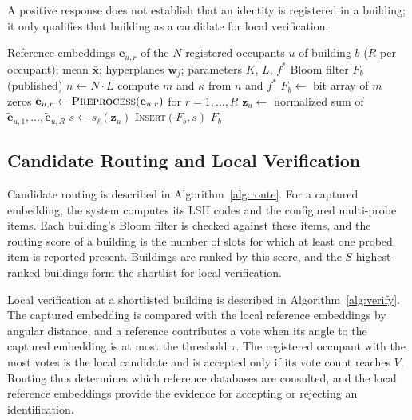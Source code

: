 \documentclass[pdflatex,sn-mathphys-num]{sn-jnl}%
\theoremstyle{thmstyleone}%
\theoremstyle{thmstyletwo}%
\theoremstyle{thmstylethree}%
\begin{document}
A positive response does not establish that an identity is registered in a building; it only qualifies that building as a candidate for local verification.

\begin{algorithm}[!t]
\footnotesize
\caption{Construction of the Bloom filter of building $b$}
\label{alg:build}
\begin{algorithmic}[1]
\Require Reference embeddings $\mathbf{e}_{u,r}$ of the $N$ registered occupants $u$ of building $b$ ($R$ per occupant); mean $\bar{\mathbf{x}}$; hyperplanes $\mathbf{w}_j$; parameters $K$, $L$, $f^*$
\Ensure Bloom filter $F_b$ (published)
\State $n\gets N\cdot L$ 
\State compute $m$ and $\kappa$ from $n$ and $f^*$ 
\State $F_b\gets$ bit array of $m$ zeros
  \State $\tilde{\mathbf{e}}_{u,r}\gets\textsc{Preprocess}(\mathbf{e}_{u,r})$ for $r=1,\dots,R$ 
  \State $\mathbf{z}_u\gets$ normalized sum of $\tilde{\mathbf{e}}_{u,1},\dots,\tilde{\mathbf{e}}_{u,R}$ 
    \State $s\gets s_\ell(\mathbf{z}_u)$ 
    \State \textsc{Insert}$(F_b,s)$ 
  \EndFor
\EndFor
\State \Return $F_b$
\end{algorithmic}
\end{algorithm}

\subsection{Candidate Routing and Local Verification}
\label{subsec:routing_verification}

Candidate routing is described in Algorithm~\ref{alg:route}. For a captured embedding, the system computes its LSH codes and the configured multi-probe items. Each building's Bloom filter is checked against these items, and the routing score of a building is the number of slots for which at least one probed item is reported present. Buildings are ranked by this score, and the $S$ highest-ranked buildings form the shortlist for local verification.

Local verification at a shortlisted building is described in Algorithm~\ref{alg:verify}. The captured embedding is compared with the local reference embeddings by angular distance, and a reference contributes a vote when its angle to the captured embedding is at most the threshold $\tau$. The registered occupant with the most votes is the local candidate and is accepted only if its vote count reaches $V$. Routing thus determines which reference databases are consulted, and the local reference embeddings provide the evidence for accepting or rejecting an identification.
\end{document}
